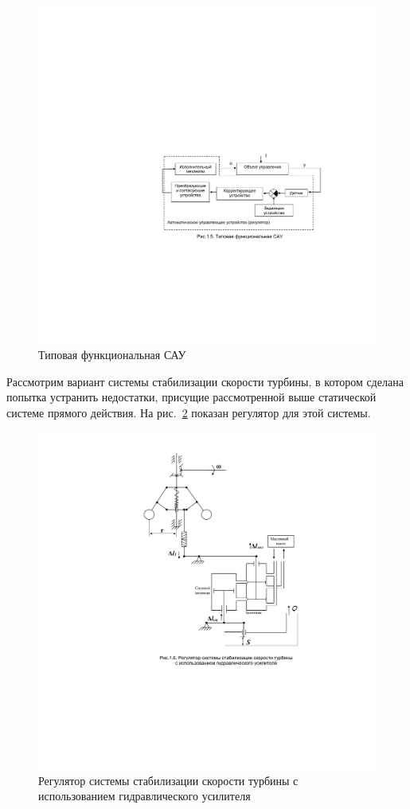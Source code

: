 \begin{figure}[h]
	\centering
	\includegraphics[scale=0.95]{images/Standardfunctionality}
	\caption{Типовая функциональная САУ}
	\label{fig:standardfunctionality}
\end{figure}

Рассмотрим вариант системы стабилизации скорости турбины, в котором сделана попытка устранить недостатки, 
присущие рассмотренной выше статической системе прямого действия. На рис.~\ref{fig:theturbinecontroller} показан регулятор для этой системы.

\begin{figure}[p]
	\centering
	\includegraphics[scale=0.99]{images/TheTurbineController}
	\caption{Регулятор системы стабилизации скорости турбины 
		с использованием гидравлического усилителя}
	\label{fig:theturbinecontroller}
\end{figure}

